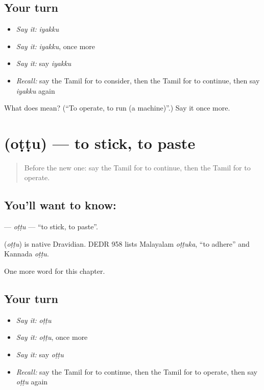 \subsection*{Your turn}
\begin{itemize}
\raggedright
  \item \emph{Say it:} \emph{iyakku}
  \item \emph{Say it:} \emph{iyakku}, once more
  \item \emph{Say it:} say \emph{iyakku}
  \item \emph{Recall:} say the Tamil for to consider, then the Tamil for to continue, then say \emph{iyakku} again
\end{itemize}

\begin{tcolorbox}[breakable,colback=teal!4,colframe=teal!35!black,title={Before you move on}]
What does  mean? (\textquotedblleft{}To operate, to run (a machine)\textquotedblright{}.) Say it once more.
\end{tcolorbox}
\section[\texorpdfstring{\ta{ஒட்டு} (oṭṭu)}{ஒட்டு (oṭṭu)}]{ (oṭṭu) — to stick, to paste}

\label{lesson:TA-C167-ottu}



\begin{quote}
Before the new one: say the Tamil for to continue, then the Tamil for to operate.
\end{quote}

\subsection*{You'll want to know: }
\textbf{} — \emph{oṭṭu} — \textquotedblleft{}to stick, to paste\textquotedblright{}.

\begin{cousinweb}
\textbf{} (\emph{oṭṭu}) is native Dravidian. DEDR 958 lists Malayalam \emph{oṭṭuka}, \textquotedblleft{}to adhere\textquotedblright{} and Kannada \emph{oṭṭu}.
\end{cousinweb}

\begin{grammarlens}[title={What you've built}]
One more word for this chapter.
\end{grammarlens}

\subsection*{Your turn}
\begin{itemize}
\raggedright
  \item \emph{Say it:} \emph{oṭṭu}
  \item \emph{Say it:} \emph{oṭṭu}, once more
  \item \emph{Say it:} say \emph{oṭṭu}
  \item \emph{Recall:} say the Tamil for to continue, then the Tamil for to operate, then say \emph{oṭṭu} again
\end{itemize}

